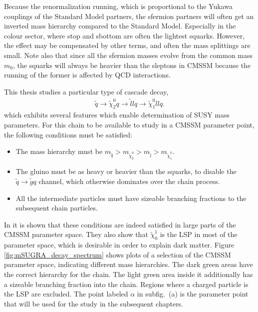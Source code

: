 \documentclass[twoside,english]{uiofysmaster}
\begin{document}
Because the renormalization running, which is proportional to the Yukawa couplings of the Standard Model partners, the sfermion partners will often get an inverted mass hierarchy compared to the Standard Model. Especially in the colour sector, where stop and sbottom are often the lightest squarks. However, the effect may be compensated by other terms, and often the mass splittings are small. Note also that since all the sfermion masses evolve from the common mass $m_0$, the squarks will always be heavier than the sleptons in CMSSM because the running of the former is affected by QCD interactions. 

This thesis studies a particular type of cascade decay,
\begin{align}
	\tilde q \to \tilde\chi_2^0q \to \tilde l l q \to \tilde \chi_1^0 ll q.	\label{eq:susyintrochap_cascade}
\end{align}
which exhibits several features which enable determination of SUSY mass parameters. For this chain to be available to study in a CMSSM parameter point, the following conditions must be satisfied: 
\begin{itemize}
	\item The mass hierarchy must be $m_{\tilde q} > m_{\tilde\chi_2^0} > m_{\tilde l} > m_{\tilde\chi_1^0}$.
	\item The gluino must be as heavy or heavier than the squarks, to disable the $\tilde q \to \tilde g q$ channel, which otherwise dominates over the chain process.
	\item All the intermediate particles must have sizeable branching fractions to the subsequent chain particles.
\end{itemize}
In \cite{Gjelsten:2004ki} it is shown that these conditions are indeed satisfied in large parts of the CMSSM parameter space. They also show that $\tilde\chi_0^1$ is the LSP in most of the parameter space, which is desirable in order to explain dark matter. Figure \ref{fig:mSUGRA_decay_spectrum} shows plots of a selection of the CMSSM parameter space, indicating different mass hierarchies. The dark green areas have the correct hierarchy for the chain. The light green area inside it additionally has a sizeable branching fraction into the chain. Regions where a charged particle is the LSP are excluded. The point labeled $\alpha$ in subfig.\ (a) is the parameter point that will be used for the study in the subsequent chapters.
\end{document}
